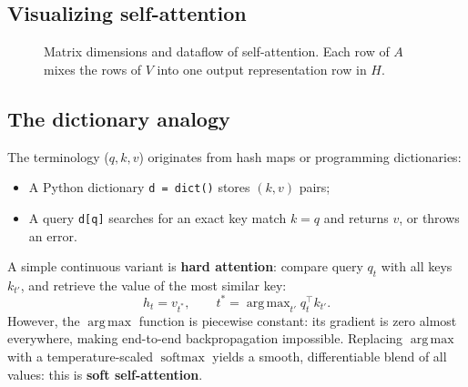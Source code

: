 \documentclass[11pt,a4paper]{article}
\DeclareMathOperator{\softmax}{softmax}
\DeclareMathOperator{\argmax}{arg\,max}
\newcommand{\slides}[1]{\par\nopagebreak\noindent{\normalfont\small\emph{(slides #1)}}\par\nopagebreak\vspace{2pt}}
\theoremstyle{definition}
\theoremstyle{plain}
\begin{document}
\subsection{Visualizing self-attention}\slides{31 / 84}
\begin{figure}[H]
\centering
{}
\caption{Matrix dimensions and dataflow of self-attention. Each row of $A$ mixes the rows of $V$ into one output representation row in $H$.}\label{fig:sa_matrix_vis}
\end{figure}

\subsection{The dictionary analogy}\slides{32 / 84}
The terminology ($q, k, v$) originates from hash maps or programming dictionaries:
\begin{itemize}[nosep]
\item A Python dictionary \texttt{d = dict()} stores $(k, v)$ pairs;
\item A query \texttt{d[q]} searches for an exact key match $k=q$ and returns $v$, or throws an error.
\end{itemize}
A simple continuous variant is \textbf{hard attention}: compare query $q_t$ with all keys $k_{t'}$, and retrieve the value of the most similar key:
\begin{equation}
h_t = v_{t^*}, \qquad t^* = \argmax_{t'} q_t^\top k_{t'}.
\end{equation}
However, the $\argmax$ function is piecewise constant: its gradient is zero almost everywhere, making end-to-end backpropagation impossible. Replacing $\argmax$ with a temperature-scaled $\softmax$ yields a smooth, differentiable blend of all values: this is \textbf{soft self-attention}.
\end{document}
